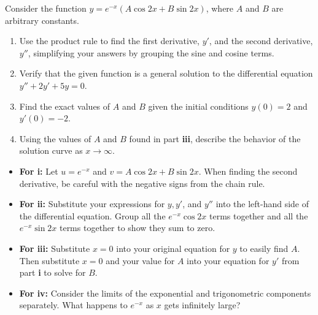 \begin{problem}
Consider the function $y = e^{-x}(A \cos 2x + B \sin 2x)$, where $A$ and $B$ are arbitrary constants.

\begin{enumerate}
    \item[\textbf{i}] Use the product rule to find the first derivative, $y'$, and the second derivative, $y''$, simplifying your answers by grouping the sine and cosine terms.
    \item[\textbf{ii}] Verify that the given function is a general solution to the differential equation $y'' + 2y' + 5y = 0$.
    \item[\textbf{iii}] Find the exact values of $A$ and $B$ given the initial conditions $y(0) = 2$ and $y'(0) = -2$.
    \item[\textbf{iv}] Using the values of $A$ and $B$ found in part \textbf{iii}, describe the behavior of the solution curve as $x \to \infty$.
\end{enumerate}
\end{problem}

\begin{hint}
\begin{itemize}
    \item \textbf{For i:} Let $u = e^{-x}$ and $v = A \cos 2x + B \sin 2x$. When finding the second derivative, be careful with the negative signs from the chain rule. 
    \item \textbf{For ii:} Substitute your expressions for $y, y'$, and $y''$ into the left-hand side of the differential equation. Group all the $e^{-x}\cos 2x$ terms together and all the $e^{-x}\sin 2x$ terms together to show they sum to zero.
    \item \textbf{For iii:} Substitute $x=0$ into your original equation for $y$ to easily find $A$. Then substitute $x=0$ and your value for $A$ into your equation for $y'$ from part \textbf{i} to solve for $B$.
    \item \textbf{For iv:} Consider the limits of the exponential and trigonometric components separately. What happens to $e^{-x}$ as $x$ gets infinitely large?
\end{itemize}
\end{hint}

